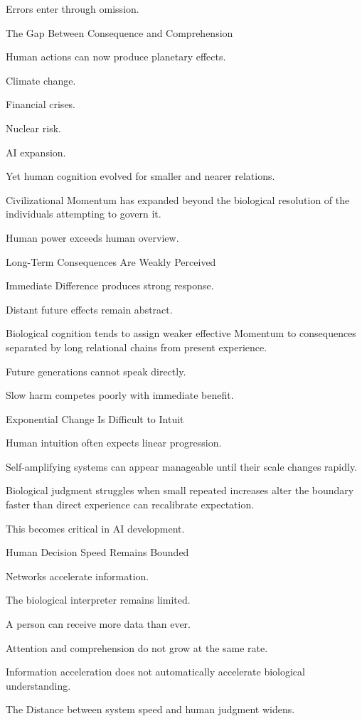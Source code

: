 Errors enter through omission.

The Gap Between Consequence and Comprehension

Human actions can now produce planetary effects.

Climate change.

Financial crises.

Nuclear risk.

AI expansion.

Yet human cognition evolved for smaller and nearer relations.

Civilizational Momentum has expanded beyond the biological resolution of the individuals attempting to govern it.

Human power exceeds human overview.

Long-Term Consequences Are Weakly Perceived

Immediate Difference produces strong response.

Distant future effects remain abstract.

Biological cognition tends to assign weaker effective Momentum to consequences separated by long relational chains from present experience.

Future generations cannot speak directly.

Slow harm competes poorly with immediate benefit.

Exponential Change Is Difficult to Intuit

Human intuition often expects linear progression.

Self-amplifying systems can appear manageable until their scale changes rapidly.

Biological judgment struggles when small repeated increases alter the boundary faster than direct experience can recalibrate expectation.

This becomes critical in AI development.

Human Decision Speed Remains Bounded

Networks accelerate information.

The biological interpreter remains limited.

A person can receive more data than ever.

Attention and comprehension do not grow at the same rate.

Information acceleration does not automatically accelerate biological understanding.

The Distance between system speed and human judgment widens.

